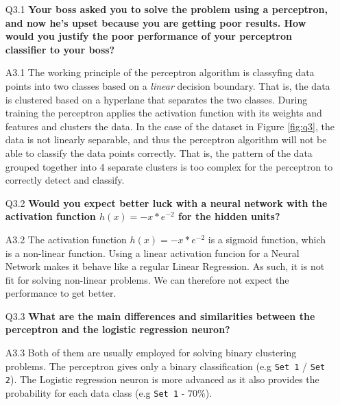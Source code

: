 \documentclass[tikz,14pt,fleqn]{article}
\begin{document}
\begin{itemize}
\item[Q3.1] \textbf{Your boss asked you to solve the problem using a perceptron, and now he's upset because you are getting poor results. How would you justify the poor performance of your perceptron classifier to your boss?}
\item[A3.1] The working principle of the perceptron algorithm is classyfing data points into two classes based on a \textit{linear} decision boundary. That is, the data is clustered based on a hyperlane that separates the two classes. During training the perceptron applies the activation function with its weights and features and clusters the data. In the case of the dataset in Figure \ref{fig:q3}, the data is not linearly separable, and thus the perceptron algorithm will not be able to classify the data points correctly. That is, the pattern of the data grouped together into 4 separate clusters is too complex for the perceptron to correctly detect and classify.

\item[Q3.2] \textbf{Would you expect better luck with a neural network with the activation function $h(x) = - x * e^{-2}$ for the hidden units?}
\item[A3.2] The activation function $h(x) = - x * e^{-2}$ is a sigmoid function, which is a non-linear function. Using a linear activation funcion for a Neural Network makes it behave like a regular Linear Regression. As such, it is not fit for solving non-linear problems. We can therefore not expect the performance to get better.

\item[Q3.3] \textbf{What are the main differences and similarities between the perceptron and the logistic regression neuron?}
\item[A3.3] Both of them are usually employed for solving binary clustering problems. The perceptron gives only a binary classification (e.g \verb|Set 1| / \verb|Set 2|). The Logistic regression neuron is more advanced as it also provides the probability for each data class (e.g \verb|Set 1| - $70\%$).

\end{itemize}
\end{document}
